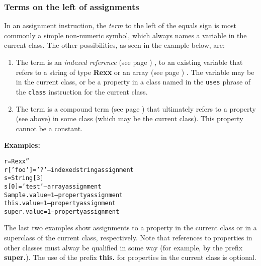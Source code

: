 \subsubsection{Terms on the left of assignments}
 
In an assignment instruction, the \emph{term} to the left of the
equals sign is most commonly a simple non-numeric symbol, which
always names a variable in the current class.
The other possibilities, as seen in the example below, are:
\begin{enumerate}
\item 
The term is an  \emph{indexed reference} (see page \pageref{refinstr}) , to an
existing variable that refers to a string of type \textbf{Rexx} or an
 array (see page \pageref{refarray}) .
The variable may be in the current class, or be a property in a class
named in the \texttt{uses} phrase of the \texttt{class} instruction for
the current class.
\item 
The term is a  compound term (see page \pageref{refcomterm})  that ultimately refers
to a property (see above) in some class (which may be the current class).
This property cannot be a constant.
\end{enumerate}
 \textbf{Examples:}
\begin{alltt}
r=Rexx ''
r['foo']='?'         -- indexed string assignment
s=String[3]
s[0]='test'          -- array assignment
Sample.value=1       -- property assignment
this.value=1         -- property assignment
super.value=1        -- property assignment
\end{alltt}

The last two examples show assignments to a property in the current
class or in a superclass of the current class, respectively.  Note that
references to properties in other classes must alway be qualified in
some way (for example, by the prefix \textbf{super.}).  The use of the
prefix \textbf{this.} for properties in the current class is optional.
